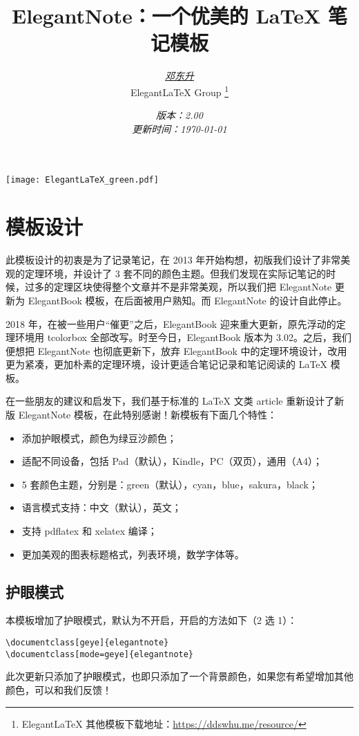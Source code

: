 \documentclass[geye,blue,normal,cn]{elegantnote}
\title{\bfseries ElegantNote：一个优美的 \LaTeX{} 笔记模板}
\author{\href{https://ddswhu.me/}{\itshape 邓东升} \\
		Elegant\LaTeX{} Group	\thanks{Elegant\LaTeX{} 其他模板下载地址：\href{https://ddswhu.me/resource/}{https://ddswhu.me/resource/}} }
\date{\small\itshape 版本：2.00 \\ 更新时间：\today}
\begin{document}
{\color{ecolor}{\maketitle}}
\centerline{\texttt{[image: ElegantLaTeX\_green.pdf]}}

\section{模板设计}
此模板设计的初衷是为了记录笔记，在 2013 年开始构想，初版我们设计了非常美观的定理环境，并设计了 3 套不同的颜色主题。但我们发现在实际记笔记的时候，过多的定理区块使得整个文章并不是非常美观，所以我们把 ElegantNote 更新为 ElegantBook 模板，在后面被用户熟知。而 ElegantNote 的设计自此停止。

2018 年，在被一些用户“催更”之后，ElegantBook 迎来重大更新，原先浮动的定理环境用 tcolorbox 全部改写。时至今日，ElegantBook 版本为 3.02。之后，我们便想把 ElegantNote 也彻底更新下，放弃 ElegantBook 中的定理环境设计，改用更为紧凑，更加朴素的定理环境，设计更适合笔记记录和笔记阅读的 \LaTeX{} 模板。

在一些朋友的建议和启发下，我们基于标准的 \LaTeX{} 文类 article 重新设计了新版 ElegantNote 模板，在此特别感谢！新模板有下面几个特性：
\begin{itemize}
\item 添加护眼模式，颜色为绿豆沙颜色；
\item 适配不同设备，包括 Pad（默认），Kindle，PC（双页），通用（A4）；
\item 5 套颜色主题，分别是：green（默认），cyan，blue，sakura，black；
\item 语言模式支持：中文（默认），英文；
\item 支持 pdflatex 和 xelatex 编译；
\item 更加美观的图表标题格式，列表环境，数学字体等。
\end{itemize}

\subsection{护眼模式}
本模板增加了护眼模式，默认为不开启，开启的方法如下（2 选 1）：
\begin{lstlisting}[frame=none]  
\documentclass[geye]{elegantnote}
\documentclass[mode=geye]{elegantnote}
\end{lstlisting}

\begin{remark}
此次更新只添加了护眼模式，也即只添加了一个背景颜色，如果您有希望增加其他颜色，可以和我们反馈！
\end{remark}
\end{document}
